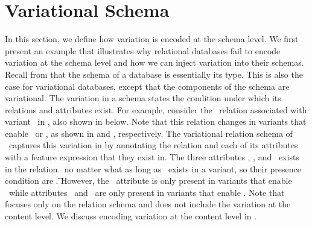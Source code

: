 \section{Variational Schema}
\label{sec:vsch}


In this section, we define how variation is encoded at the schema level. We first 
present an example that
 illustrates why relational databases fail to encode
variation at the schema level and how we can inject variation into their schemas.
Recall from  that the schema of a database is essentially its type.
This is also the case for variational databases, except that the components 
of the schema are variational.
The  variation in a schema states the condition under which its relations and
attributes exist.
%
For example, consider the \empbio\ relation associated with variant \vThree\ in ,
also shown in  below.
% 
Note that this relation changes in variants that enable \vFour\ or \vFive, as shown in 
 and , respectively.
%
The variational relation schema of \empbio\ captures this variation
in  by annotating the relation and each of its attributes with
 a feature expression that they exist in.
The three attributes 
\empno, \sex, and \birthdate\ exists in the relation \empbio\ no matter what as long as
\empbio\ exists in a variant, so their presence condition are \t. 
However, the \name\ attribute is only present in variants
that enable \vFour\ while attributes \fname\ and \lname\ are only present in variants
that enable \vFive.
%
Note that  focuses only on the relation schema and does not 
include the variation at the content level. We discuss encoding variation at the 
content level in .



